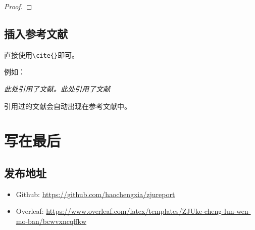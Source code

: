 \documentclass[12pt,hyperref,a4paper,UTF8]{ctexart}
\begin{document}
\begin{Definition}
\end{Definition}

\begin{Example}
\end{Example}

\begin{proof}
\end{proof}

\subsection{插入参考文献}
直接使用\verb|\cite{}|即可。

例如：


   \textit{ 此处引用了文献\cite{0Isaac}。此处引用了文献\cite{2016The}}


引用过的文献会自动出现在参考文献中。

\section{写在最后}
\subsection{发布地址}
\begin{itemize}
    \item Github: \url{https://github.com/haochengxia/zjureport}
    \item Overleaf:  \url{https://www.overleaf.com/latex/templates/ZJUke-cheng-lun-wen-mo-ban/bcwvxncqffkw}
\end{itemize}


\end{document}
